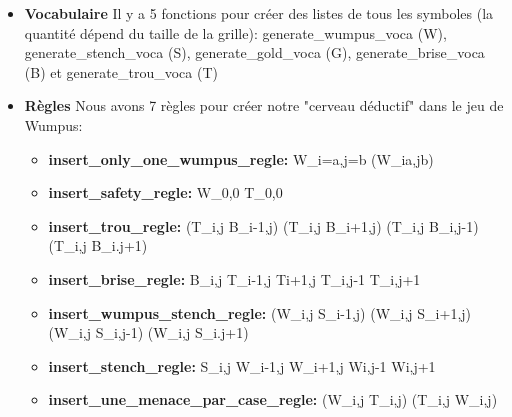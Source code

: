 \documentclass{article}
\begin{document}
\begin{itemize}
    \item \textbf{Vocabulaire}
Il y a 5 fonctions pour créer des listes de tous les symboles (la quantité dépend du taille de la grille): generate\_wumpus\_voca (W), generate\_stench\_voca (S), generate\_gold\_voca (G), generate\_brise\_voca (B) et generate\_trou\_voca (T)
\newline  \newline
    \item \textbf{Règles}
Nous avons 7 règles pour créer notre "cerveau déductif" dans le jeu de Wumpus: 

        \begin{itemize}
            \item \textbf{insert\_only\_one\_wumpus\_regle:} W_{i=a,j=b} \Rightarrow \land (\neg W_{i\ne a,j\ne b}) \newline  \newline

            \item \textbf{insert\_safety\_regle:} \neg W_{0,0} \land  \neg T_{0,0} \newline  \newline

            \item \textbf{insert\_trou\_regle:} (\neg T_{i,j} \lor B_{i-1,j}) \land (\neg T_{i,j} \lor B_{i+1,j}) \land (\neg T_{i,j} \lor B_{i,j-1}) \land (\neg T_{i,j} \lor B_{i.j+1}) \newline  \newline

            \item \textbf{insert\_brise\_regle:}  \neg B_{i,j} \lor T_{i-1,j} \lor T{i+1,j} \lor T_{i,j-1} \lor T_{i,j+1} \newline  \newline

            \item \textbf{insert\_wumpus\_stench\_regle:} (\neg W_{i,j} \lor S_{i-1,j}) \land (\neg W_{i,j} \lor S_{i+1,j}) \land (\neg W_{i,j} \lor S_{i,j-1}) \land (\neg W_{i,j} \lor S_{i.j+1}) \newline  \newline

            \item \textbf{insert\_stench\_regle:} \neg S_{i,j} \lor W_{i-1,j} \lor W_{i+1,j} \lor W{i,j-1} \lor W{i,j+1} \newline  \newline

            \item \textbf{insert\_une\_menace\_par\_case\_regle:} (\neg W_{i,j} \lor \neg T_{i,j}) \land (\neg T_{i,j} \lor \neg W_{i,j}) 

        \end{itemize}
\end{itemize}
\end{document}
